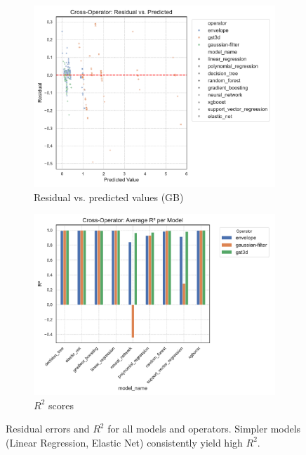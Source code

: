 \begin{figure}[htbp]
    \centering
    \begin{subfigure}[t]{0.49\textwidth}
        \includegraphics[width=\textwidth]{assets/images/05/residual_vs_predicted}
        \caption{Residual vs. predicted values (GB)}
    \end{subfigure}
    \hfill
    \begin{subfigure}[t]{0.49\textwidth}
        \includegraphics[width=\textwidth]{assets/images/05/cross_model_r2_bar}
        \caption{$R^2$ scores}
    \end{subfigure}
    \caption{Residual errors and $R^2$ for all models and operators. Simpler models (Linear Regression, Elastic Net) consistently yield high $R^2$.}
    \label{fig:residual_vs_predicted_and_r2_bar}
\end{figure}

